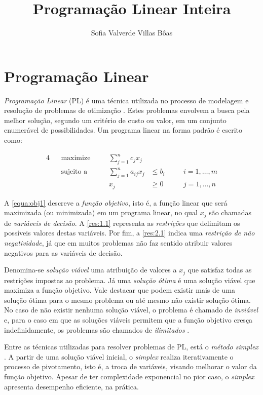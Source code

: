 \documentclass[12pt,a4paper]{article}
\title{\textbf{Programação Linear Inteira}}
\author{Sofia Valverde Villas Bôas}
\date{}
\begin{document}
\maketitle

\section{Programação Linear}

\emph{Programação Linear} (PL) é uma técnica utilizada no processo de modelagem e resolução de problemas de otimização \cite{Chvatal1983}. Estes problemas envolvem a busca pela melhor solução, segundo um critério de custo ou valor, em um conjunto enumerável de possibilidades. Um programa linear na forma padrão é escrito como:

\begin{alignat}{4}
&&\text{maximize}   \quad && \sum_{j = 1}^{n} c_j x_j \label{equa:obj1}\\
&&\text{sujeito a} \quad && \sum_{j = 1}^{n} a_{ij} x_j & \leq b_i     \quad && i = 1, \ldots, m \label{res:1.1} \\
&&                        && x_j                       & \ge 0        \quad &&  j = 1, \ldots, n \label{res:2.1}
\end{alignat}

A \autoref{equa:obj1} descreve a \textit{função objetivo}, isto é, a função linear que será maximizada (ou minimizada) em um programa linear, no qual $x_j$ são chamadas de \textit{variáveis de decisão}. A \autoref{res:1.1} representa as \textit{restrições} que delimitam os possíveis valores destas variáveis. Por fim, a \autoref{res:2.1} indica uma \textit{restrição de não negatividade}, já que em muitos problemas não faz sentido atribuir valores negativos para as variáveis de decisão. 

Denomina-se \textit{solução viável} uma atribuição de valores a $x_j$ que satisfaz todas as restrições impostas ao problema. Já uma \textit{solução ótima} é uma solução viável que maximiza a função objetivo. Vale destacar que podem existir mais de uma solução ótima para o mesmo problema ou até mesmo não existir solução ótima. No caso de não existir nenhuma solução viável, o problema é chamado de \textit{inviável} e, para o caso em que as soluções viáveis permitem que a função objetivo cresça indefinidamente, os problemas são chamados de \textit{ilimitados} \cite{Chvatal1983}.

Entre as técnicas utilizadas para resolver problemas de PL, está o \textit{método simplex} \cite{Chvatal1983}. A partir de uma solução viável inicial, o \textit{simplex} realiza iterativamente o processo de pivotamento, isto é, a troca de variáveis, visando melhorar o valor da função objetivo. Apesar de ter complexidade exponencial no pior caso, o \textit{simplex} apresenta desempenho eficiente, na prática.
\end{document}
